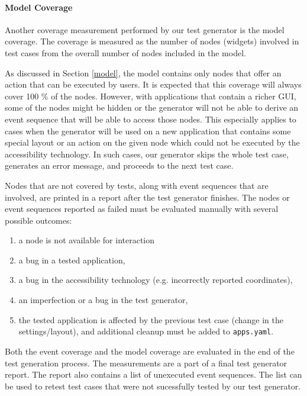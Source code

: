\paragraph{Model Coverage} Another coverage measurement performed by our test generator is the model coverage. The coverage is measured as the number of nodes (widgets) involved in test cases from the overall number of nodes included in the model.

As discussed in Section \ref{model}, the model contains only nodes that offer an action that can be executed by users. It is expected that this coverage will always cover 100 \% of the nodes. However, with applications that contain a richer GUI, some of the nodes might be hidden or the generator will not be able to derive an event sequence that will be able to access those nodes. This especially applies to cases when the generator will be used on a new application that contains some special layout or an action on the given node which could not be executed by the accessibility technology. In such cases, our generator skips the whole test case, generates an error message, and proceeds to the next test case. 

Nodes that are not covered by tests, along with event sequences that are involved, are printed in a report after the test generator finishes. The nodes or event sequences reported as failed must be evaluated manually with several possible outcomes:

\begin{enumerate}
    \item a node is not available for interaction
    \item a bug in a tested application,
    \item a bug in the accessibility technology (e.g. incorrectly reported coordinates),
    \item an imperfection or a bug in the test generator,
    \item the tested application is affected by the previous test case (change in the settings/layout), and additional cleanup must be added to \texttt{apps.yaml}.
\end{enumerate}

Both the event coverage and the model coverage are evaluated in the end of the test generation process. The measurements are a part of a final test generator report. The report also contains a list of unexecuted event sequences. The list can be used to retest test cases that were not sucessfully tested by our test generator.

